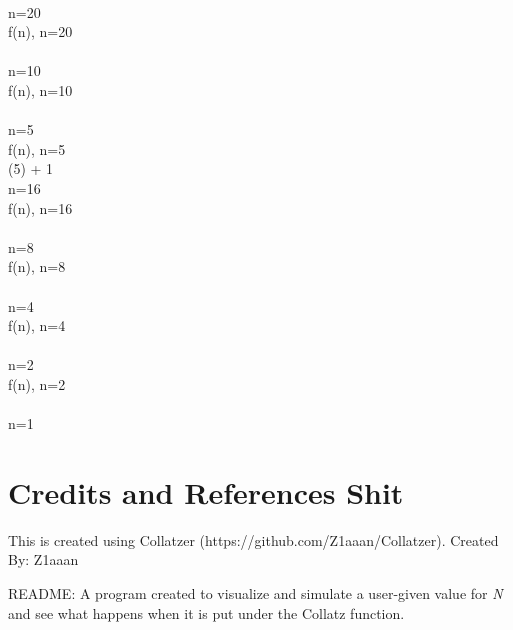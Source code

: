 \documentclass{article}
\begin{document}
 \Rightarrow {} 
 \\ 
 \Rightarrow n=20
 \\[3mm] 
f(n), n=20
 \\ 
 \Rightarrow {} 
 \\ 
 \Rightarrow n=10
 \\[3mm] 
f(n), n=10
 \\ 
 \Rightarrow {} 
 \\ 
 \Rightarrow n=5
 \\[3mm] 
f(n), n=5
 \\ 
 (5) + 1
 \\ 
 \Rightarrow n=16
 \\[3mm] 
f(n), n=16
 \\ 
 \Rightarrow {} 
 \\ 
 \Rightarrow n=8
 \\[3mm] 
f(n), n=8
 \\ 
 \Rightarrow {} 
 \\ 
 \Rightarrow n=4
 \\[3mm] 
f(n), n=4
 \\ 
 \Rightarrow {} 
 \\ 
 \Rightarrow n=2
 \\[3mm] 
f(n), n=2
 \\ 
 \Rightarrow {} 
 \\ 
 \Rightarrow n=1
 \\[3mm] 

    \section{Credits and References Shit}
    This is created using Collatzer (https://github.com/Z1aaan/Collatzer).
    Created By: Z1aaan
    
    README:
    A program created to visualize and simulate a user-given value for \textit{N} 
    and see what happens when it is put under the Collatz function.
    
\end{document}
